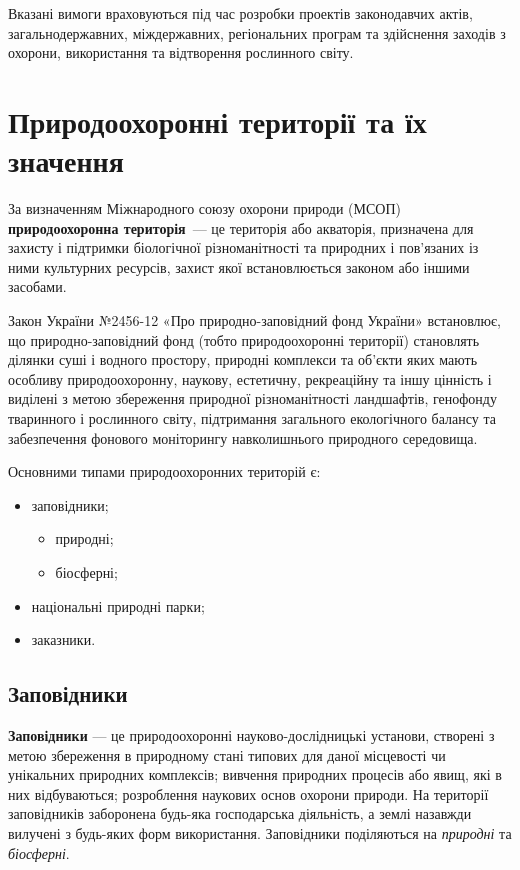 \documentclass[a4paper,oneside,DIV=10,12pt]{scrreprt}
\newcommand\defterm[1]{\textbf{#1}}
\begin{document}
			Вказані вимоги враховуються під час розробки проектів законодавчих актів, загальнодержавних, міждержавних, регіональних програм та здійснення заходів з охорони, використання та відтворення рослинного світу.
			
	\chapter{Природоохоронні території та їх значення}
		За визначенням Міжнародного союзу охорони природи (МСОП) \defterm{природоохоронна територія}~--- це територія або акваторія, призначена для захисту і підтримки біологічної різноманітності та природних і пов'язаних із ними культурних ресурсів, захист якої встановлюється законом або іншими засобами.
		
		Закон України №2456-12 «Про природно-заповідний фонд України» встановлює, що природно-заповідний фонд (тобто природоохоронні території) становлять ділянки суші і водного простору, природні комплекси та об'єкти яких мають особливу природоохоронну, наукову, естетичну, рекреаційну та іншу цінність і виділені з метою збереження природної різноманітності ландшафтів, генофонду тваринного і рослинного світу, підтримання загального екологічного балансу та забезпечення фонового моніторингу навколишнього природного середовища.
		
		Основними типами природоохоронних територій є:
		\begin{itemize}
			\item заповідники;
				\begin{itemize}
					\item природні;
					\item біосферні;
				\end{itemize}
			\item національні природні парки;
			\item заказники.
		\end{itemize}
		
		
		\section{Заповідники}
			\defterm{Заповідники} --- це природоохоронні науково-дослідницькі установи, створені з метою збереження в природному стані типових для даної місцевості чи унікальних природних комплексів; вивчення природних процесів або явищ, які в них відбуваються; розроблення наукових основ охорони природи. На території заповідників заборонена будь-яка господарська діяльність, а землі назавжди вилучені з будь-яких форм використання. Заповідники поділяються на \emph{природні} та \emph{біосферні}.
			
\end{document}
